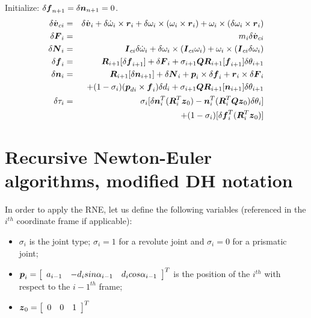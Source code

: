\begin{itemize}
Initialize: $\delta \mbold{f}_{n+1} = \delta \mbold{n}_{n+1} = 0$.
\begin{eqnarray}
\delta \dot{\mbold{v}}_{ci} & = & 
\delta \dot{\mbold{v}}_i + \delta \dot{\omega}_i \times \mbold{r}_i 
+ \delta \omega_i \times (\omega_i \times \mbold{r}_i) 
+ \omega_i \times (\delta \omega_i \times \mbold{r}_i) \\
\delta \mbold{F}_i & = & m_i \delta \dot{\mbold{v}}_{ci} \\
\delta \mbold{N}_i & = & \mbold{I}_{ci} \delta \dot{\omega}_i 
+ \delta \omega_i \times (\mbold{I}_{ci} \omega_i) 
+ \omega_i \times (\mbold{I}_{ci} \delta \omega_i) \\
\delta \mbold{f}_i & = & \mbold{R}_{i+1} [ \delta \mbold{f}_{i+1} ]  
+ \delta \mbold{F}_{i} + \sigma_{i+1} \mbold{Q} \mbold{R}_{i+1} [ \mbold{f}_{i+1} ] \delta \theta_{i+1} \\
\delta \mbold{n}_i & = & \mbold{R}_{i+1} [ \delta \mbold{n}_{i+1} ]  
+ \delta \mbold{N}_{i} + \mbold{p}_{i} \times \delta \mbold{f}_{i} 
+ \mbold{r}_{i} \times \delta \mbold{F}_{i} \nonumber \\
& & + (1 - \sigma_i) (\mbold{p}_{di} \times \mbold{f}_{i}) \delta d_i 
+ \sigma_{i+1} \mbold{Q} \mbold{R}_{i+1} [ \mbold{n}_{i+1} ] \delta \theta_{i+1} \\
\delta \tau_i & = & \sigma_i [ \delta \mbold{n}_i^T (\mbold{R}_i^T \mbold{z}_0) 
- \mbold{n}_i^T (\mbold{R}_i^T \mbold{Q} \mbold{z}_0) \delta \theta_i] \nonumber \\
& & + (1 -\sigma_i) [ \delta \mbold{f}_i^T (\mbold{R}_i^T \mbold{z}_0) ]
\end{eqnarray}
\end{itemize}


\chapter{Recursive Newton-Euler algorithms, modified DH notation}

In order to apply the RNE, let us define the following variables 
(referenced in the $i^{th}$ coordinate frame if applicable):
\begin{itemize}
\item $\sigma_i$ is the joint type; $\sigma_i = 1$ for a revolute
  joint and $\sigma_i = 0$ for a prismatic joint;
\item $\mbold{p}_i = \matr{ccc}{a_{i-1} & -d_i sin \alpha_{i-1} &
d_i cos \alpha_{i-1}}^T$ is the
position of the $i^{th}$ with respect to the $i-1^{th}$ frame;
\item $\mbold{z}_0 = \matr{ccc}{0 & 0 & 1}^T $
\end{itemize}


